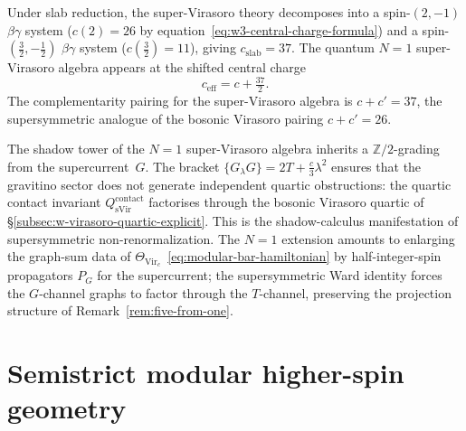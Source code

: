 \begin{remark}
\label{rem:super-vir-slab-reduction}
Under slab reduction, the super-Virasoro theory decomposes into a
spin-$(2,-1)$ $\beta\gamma$ system ($c(2) = 26$ by
equation~\eqref{eq:w3-central-charge-formula}) and a
spin-$(\frac{3}{2},-\frac{1}{2})$ $\beta\gamma$ system
($c(\frac{3}{2}) = 11$), giving $c_{\mathrm{slab}} = 37$.  The quantum
$N=1$ super-Virasoro algebra appears at the shifted central charge
\begin{equation}\label{eq:svir-ceff}
  c_{\mathrm{eff}} = c + \tfrac{37}{2}.
\end{equation}
The complementarity pairing for the super-Virasoro algebra
is $c + c' = 37$, the supersymmetric analogue of the bosonic
Virasoro pairing $c + c' = 26$.
\end{remark}

\begin{remark}
\label{rem:super-virasoro-shadow-tower}
The shadow tower of the $N=1$ super-Virasoro algebra inherits a
$\mathbb{Z}/2$-grading from the supercurrent~$G$.  The bracket
$\{G_\lambda G\} = 2T + \frac{c}{3}\lambda^2$ ensures that the
gravitino sector does not generate independent quartic obstructions:
the quartic contact invariant
$Q^{\mathrm{contact}}_{\mathrm{sVir}}$ factorises through the
bosonic Virasoro quartic of
\S\ref{subsec:w-virasoro-quartic-explicit}.  This is the
shadow-calculus manifestation of supersymmetric non-renormalization.
The $N=1$ extension amounts to
enlarging the graph-sum data of
$\Theta_{\mathrm{Vir}_c}$~\eqref{eq:modular-bar-hamiltonian} by
half-integer-spin propagators $P_G$ for the supercurrent; the
supersymmetric Ward identity forces the $G$-channel graphs to
factor through the $T$-channel, preserving the projection structure
of Remark~\ref{rem:five-from-one}.
\end{remark}


\section{Semistrict modular higher-spin geometry}
\label{sec:semistrict-modular-higher-spin}

